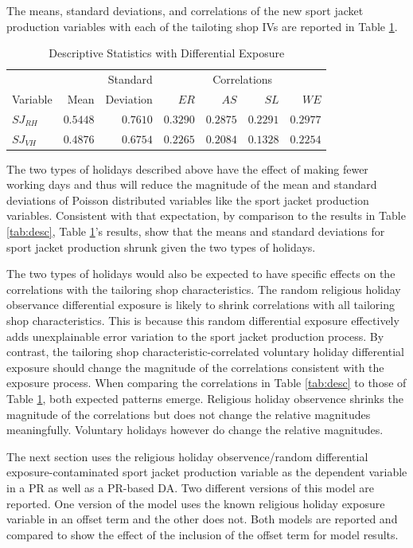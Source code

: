 \documentclass[ShortAfour,times,sageapa]{sagej}
\begin{document}
	The means, standard deviations, and correlations of the new sport jacket production variables with each of the tailoting shop IVs are reported in Table \ref{tab:dscEx}.
	
	\begin{table}[h!]
		\centering
		\caption{\centering Descriptive Statistics with Differential Exposure}
		\begin{tabular}{lrrrrrr}
			\toprule
			&  &  Standard & \multicolumn{4}{c}{Correlations} \\ 
			\cmidrule(lr){4-7}
			Variable & Mean & Deviation & $ER$ & $AS$ & $SL$ & $WE$ \\ 
			\midrule
			$SJ_{RH}$ & $0.5448$ & $0.7610$ & $0.3290$ & $0.2875$ & $0.2291$ & $0.2977$ \\  
			$SJ_{VH}$ & $0.4876$ & $0.6754$ & $0.2265$ & $0.2084$ & $0.1328$ & $0.2254$ \\
			\bottomrule
		\end{tabular}
		\label{tab:dscEx}
	\end{table}
	
	The two types of holidays described above have the effect of making fewer working days and thus will reduce the magnitude of the mean and standard deviations of Poisson distributed variables like the sport jacket production variables.	
	Consistent with that expectation, by comparison to the results in Table \ref{tab:desc}, Table \ref{tab:dscEx}'s results, show that the means and standard deviations for sport jacket production shrunk given the two types of holidays.
	
	The two types of holidays would also be expected to have specific effects on the correlations with the tailoring shop characteristics.
	The random religious holiday observance differential exposure is likely to shrink correlations with all tailoring shop characteristics.
	This is because this random differential exposure effectively adds unexplainable error variation to the sport jacket production process.
	By contrast, the tailoring shop characteristic-correlated voluntary holiday differential exposure should change the magnitude of the correlations consistent with the exposure process.
	When comparing the correlations in Table \ref{tab:desc} to those of Table \ref{tab:dscEx}, both expected patterns emerge.
	Religious holiday observence shrinks the magnitude of the correlations but does not change the relative magnitudes meaningfully.
	Voluntary holidays however do change the relative magnitudes.
	
	The next section uses the religious holiday observence/random differential exposure-contaminated sport jacket production variable as the dependent variable in a PR as well as a PR-based DA.
	Two different versions of this model are reported.
	One version of the model uses the known religious holiday exposure variable in an offset term and the other does not.
	Both models are reported and compared to show the effect of the inclusion of the offset term for model results.
	
\end{document}
